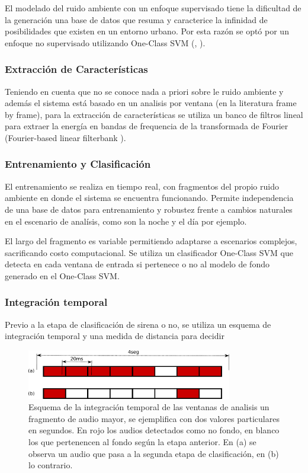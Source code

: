 \documentclass{article}
\begin{document}
El modelado del ruido ambiente con un enfoque supervisado tiene la dificultad de  la generación una base de datos que resuma y caracterice la infinidad de posibilidades que existen en un entorno urbano. Por esta razón se optó por un enfoque no supervisado utilizando One-Class SVM (\cite{rabaoui2008one}, \citep{lecomte2011abnormal}).

\subsubsection*{Extracción de Características}
Teniendo en cuenta que no se conoce nada a priori sobre le ruido ambiente y además el sistema está basado en un analisis por ventana (en la literatura frame by frame), para la extracción de características se utiliza un banco de filtros lineal para extraer la energía en bandas de frequencia de la transformada de Fourier (Fourier-based linear filterbank \citep{lecomte2011abnormal}).

\subsubsection*{Entrenamiento y Clasificación}
El entrenamiento se realiza en tiempo real, con fragmentos del propio ruido ambiente en donde el sistema se encuentra funcionando. Permite independencia de una base de datos para entrenamiento y robustez frente a cambios naturales en el escenario de analísis, como son la noche y el día por ejemplo. 
\smallskip

El largo del fragmento es variable permitiendo adaptarse a escenarios complejos, sacrificando costo computacional. Se utiliza un clasificador One-Class SVM que detecta en cada ventana de entrada si pertenece o no al modelo de fondo generado en el One-Class SVM.

\subsubsection{Integración temporal}

Previo a la etapa de clasificación de sirena o no, se utiliza un esquema de integración temporal y una medida de distancia para decidir 

\begin{figure}[h]
\begin{center}
\includegraphics[width=0.8\textwidth]{integracion_temporal} 
\caption{Esquema de la integración temporal de las ventanas de analisis un fragmento de audio mayor, se ejemplifica con dos valores particulares en segundos. En rojo los audios detectados como no fondo, en blanco los que pertenencen al fondo según la etapa anterior. En (a) se observa un audio que pasa a la segunda etapa de clasificación, en (b) lo contrario.}
\label{fig:integracion_temporal}
\end{center}
\end{figure}
 
\end{document}
